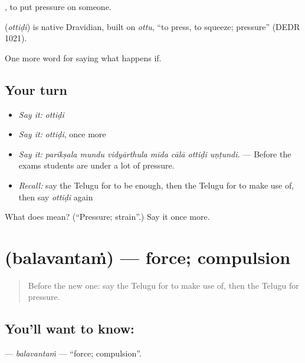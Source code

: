  , to put pressure on someone.

\begin{cousinweb}
\textbf{} (\emph{ottiḍi}) is native Dravidian, built on \emph{ottu}, \textquotedblleft{}to press, to squeeze; pressure\textquotedblright{} (DEDR 1021).
\end{cousinweb}

\begin{grammarlens}[title={What you've built}]
One more word for saying what happens if.
\end{grammarlens}

\subsection*{Your turn}
\begin{itemize}
\raggedright
  \item \emph{Say it:} \emph{ottiḍi}
  \item \emph{Say it:} \emph{ottiḍi}, once more
  \item \emph{Say it:} \emph{parīkṣala mundu vidyārthula mīda cālā ottiḍi uṇṭundi.} — Before the exams students are under a lot of pressure.
  \item \emph{Recall:} say the Telugu for to be enough, then the Telugu for to make use of, then say \emph{ottiḍi} again
\end{itemize}

\begin{tcolorbox}[breakable,colback=teal!4,colframe=teal!35!black,title={Before you move on}]
What does  mean? (\textquotedblleft{}Pressure; strain\textquotedblright{}.) Say it once more.
\end{tcolorbox}
\section[\texorpdfstring{\te{బలవంతం} (balavantaṁ)}{బలవంతం (balavantaṁ)}]{ (balavantaṁ) — force; compulsion}

\label{lesson:TE-C424-balavantam}



\begin{quote}
Before the new one: say the Telugu for to make use of, then the Telugu for pressure.
\end{quote}

\subsection*{You'll want to know: }
\textbf{} — \emph{balavantaṁ} — \textquotedblleft{}force; compulsion\textquotedblright{}.

